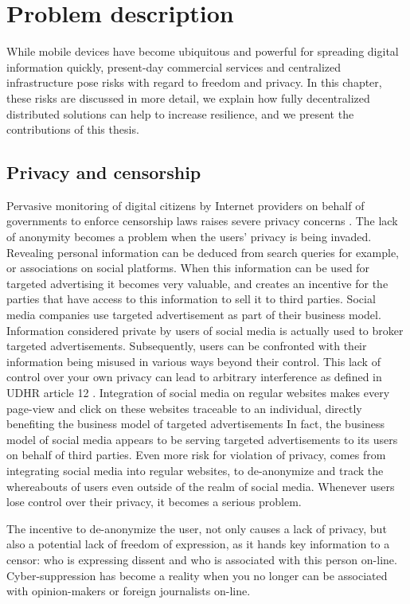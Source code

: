 \chapter{Problem description}\label{ch:problem_desc}
While mobile devices have become ubiquitous and powerful for spreading digital information quickly, present-day commercial services and centralized infrastructure pose risks with regard to freedom and privacy.
In this chapter, these risks are discussed in more detail, we explain how fully decentralized distributed solutions can help to increase resilience, and we present the contributions of this thesis.

\section{Privacy and censorship}
Pervasive monitoring of digital citizens by Internet providers on behalf of governments to enforce censorship laws raises severe privacy concerns \cite{nsa_privacy}.
The lack of anonymity becomes a problem when the users' privacy is being invaded.
Revealing personal information can be deduced from search queries for example, or associations on social platforms.
When this information can be used for targeted advertising it becomes very valuable, and creates an incentive for the parties that have access to this information to sell it to third parties.
Social media companies use targeted advertisement as part of their business model.
Information considered private by users of social media is actually used to broker targeted advertisements.
Subsequently, users can be confronted with their information being misused in various ways beyond their control.
This lack of control over your own privacy can lead to arbitrary interference as defined in UDHR article 12 \cite{UDHR}.
Integration of social media on regular websites makes every page-view and click on these websites traceable to an individual, directly benefiting the business model of targeted advertisements
In fact, the business model of social media appears to be serving targeted advertisements to its users on behalf of third parties.
Even more risk for violation of privacy, comes from integrating social media into regular websites, to de-anonymize and track the whereabouts of users even outside of the realm of social media.
Whenever users lose control over their privacy, it becomes a serious problem.

The incentive to de-anonymize the user, not only causes a lack of privacy, but also a potential lack of freedom of expression, as it hands key information to a censor: who is expressing dissent and who is associated with this person on-line.
Cyber-suppression has become a reality when you no longer can be associated with opinion-makers or foreign journalists on-line.

